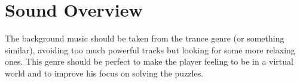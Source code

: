 \documentclass[12pt, a4paper]{report}
\begin{document}
\chapter{Sound Overview}
The background music should be taken from the trance genre (or something similar), avoiding too much powerful tracks but looking for some more relaxing ones. This genre should be perfect to make the player feeling to be in a virtual world and to improve his focus on solving the puzzles.
\end{document}

